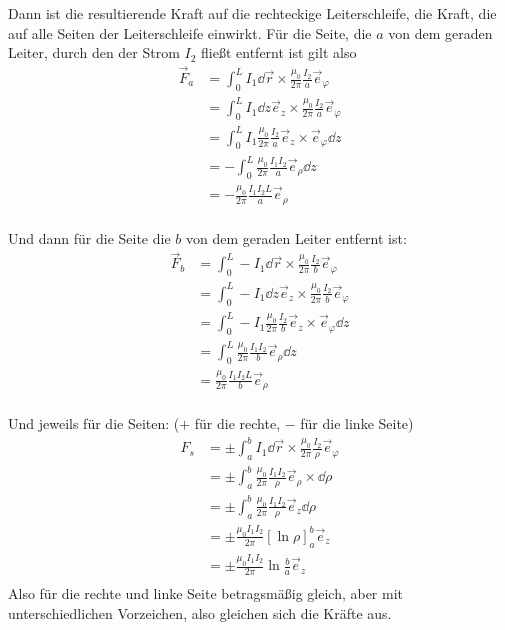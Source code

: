 \documentclass[sectionformat=aufgabe]{gadsescript}
\begin{document}
Dann ist die resultierende Kraft auf die rechteckige Leiterschleife, die Kraft, die auf alle Seiten der Leiterschleife einwirkt.
Für die Seite, die $ a $ von dem geraden Leiter, durch den der Strom $ I_2 $ fließt entfernt ist gilt also
\begin{align*}
	\vec F_a &= \int_{0}^{L} I_1 \dd \vec r \times \frac{ \mu_0 }{ 2 \pi  } \frac{ I_2 }{ a } \vec e_\varphi \\
	~ &= \int_{0}^{L} I_1 \dd z \vec e_z \times \frac{ \mu_0 }{ 2 \pi  } \frac{ I_2 }{ a } \vec e_\varphi \\
	~ &= \int_{0}^{L} I_1 \frac{ \mu_0 }{ 2 \pi  } \frac{ I_2 }{ a } \vec e_{z} \times \vec e_\varphi \dd z \\
	~ &= - \int_{0}^{L} \frac{ \mu_0 }{ 2 \pi  } \frac{ I_1 I_2 }{ a } \vec e_\rho \dd z \\
	~ &= - \frac{ \mu_0 }{ 2 \pi  } \frac{ I_1 I_2L }{ a } \vec e_\rho \\
\end{align*}

Und dann für die Seite die $ b $ von dem geraden Leiter entfernt ist:
\begin{align*}
	\vec F_b &= \int_{0}^{L} - I_1 \dd \vec r \times \frac{ \mu_0 }{ 2 \pi  } \frac{ I_2 }{ b } \vec e_\varphi \\
	~ &= \int_{0}^{L} - I_1 \dd z \vec e_z \times \frac{ \mu_0 }{ 2 \pi  } \frac{ I_2 }{ b } \vec e_\varphi \\
	~ &= \int_{0}^{L} - I_1 \frac{ \mu_0 }{ 2 \pi  } \frac{ I_2 }{ b } \vec e_{z} \times \vec e_\varphi \dd z \\
	~ &= \int_{0}^{L} \frac{ \mu_0 }{ 2 \pi  } \frac{ I_1 I_2 }{ b } \vec e_\rho \dd z \\
	~ &= \frac{ \mu_0 }{ 2 \pi  } \frac{ I_1 I_2L }{ b } \vec e_\rho \\
\end{align*}

Und jeweils für die Seiten: ($ + $ für die rechte, $ - $ für die linke Seite)
\begin{align*}
	F_s &= \pm \int_{a}^{b} I_1 \dd \vec r \times \frac{ \mu_0 }{ 2 \pi  } \frac{ I_2 }{ \rho } \vec e_\varphi \\
	~ &= \pm \int_{a}^{b} \frac{ \mu_0 }{ 2 \pi  } \frac{ I_1I_2 }{ \rho } \vec e_\rho \times \dd \rho\\
	~ &= \pm \int_{a}^{b} \frac{ \mu_0 }{ 2 \pi  } \frac{ I_1I_2 }{ \rho } \vec e_z \dd \rho\\
	~ &= \pm \frac{ \mu_0 I_1I_2 }{ 2 \pi  } \left[ \ln \rho \right]_a^b \vec e_z \\
	~ &= \pm \frac{ \mu_0 I_1I_2 }{ 2 \pi  } \ln \frac{ b }{ a } \vec e_z \\
\end{align*}
Also für die rechte und linke Seite betragsmäßig gleich, aber mit unterschiedlichen Vorzeichen, also gleichen sich die Kräfte aus.
\end{document}
